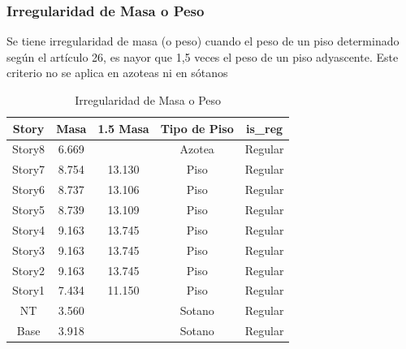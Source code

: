 \documentclass{article}%
\begin{document}
%
\subsubsection{Irregularidad de Masa o Peso}%
\label{ssubsec:IrregularidaddeMasaoPeso}%
\begin{tcolorbox}[colback=gray!5!white,colframe=cyan!75!black,fonttitle=\bfseries,title=Tabla N°9 E-030]%
Se tiene irregularidad de masa (o peso) cuando el peso de un piso determinado según el artículo 26, es nayor que 1,5 veces el peso de un piso adyascente. Este criterio no se aplica en azoteas ni en sótanos%
\end{tcolorbox}%


\begin{table}[H]%
\centering%
\caption{Irregularidad de Masa o Peso}%
\begin{tabular}{ccccc}
\toprule
Story & Masa & 1.5 Masa & Tipo de Piso & is\_reg \\
\midrule
Story8 & 6.669 &  & Azotea & Regular \\
Story7 & 8.754 & 13.130 & Piso & Regular \\
Story6 & 8.737 & 13.106 & Piso & Regular \\
Story5 & 8.739 & 13.109 & Piso & Regular \\
Story4 & 9.163 & 13.745 & Piso & Regular \\
Story3 & 9.163 & 13.745 & Piso & Regular \\
Story2 & 9.163 & 13.745 & Piso & Regular \\
Story1 & 7.434 & 11.150 & Piso & Regular \\
NT & 3.560 &  & Sotano & Regular \\
Base & 3.918 &  & Sotano & Regular \\
\bottomrule
\end{tabular}
%
\end{table}

%
\end{document}
